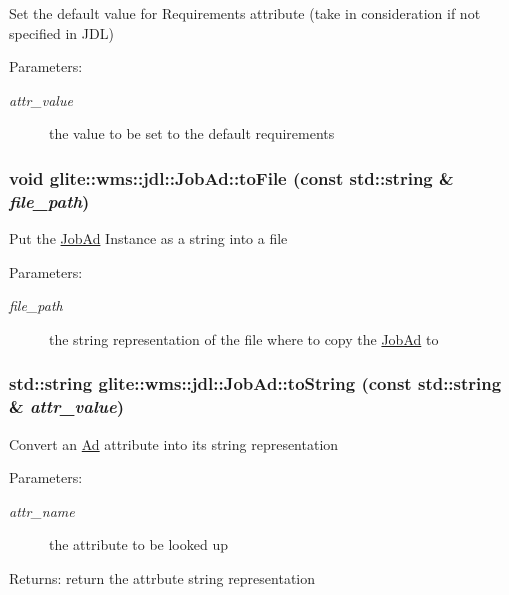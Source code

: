 Set the default value for Requirements attribute (take in consideration if not specified in JDL) \begin{Desc}
\item[Parameters:]
\begin{description}
\item[{\em attr\_\-value}]the value to be set to the default requirements\end{description}
\end{Desc}
\hypertarget{classglite_1_1wms_1_1jdl_1_1JobAd_z3_4}{
\subsubsection[toFile]{\setlength{\rightskip}{0pt plus 5cm}void glite::wms::jdl::Job\-Ad::to\-File (const std::string \& {\em file\_\-path})}}
\label{classglite_1_1wms_1_1jdl_1_1JobAd_z3_4}


Put the \hyperlink{classglite_1_1wms_1_1jdl_1_1JobAd}{Job\-Ad} Instance as a string into a file \begin{Desc}
\item[Parameters:]
\begin{description}
\item[{\em file\_\-path}]the string representation of the file where to copy the \hyperlink{classglite_1_1wms_1_1jdl_1_1JobAd}{Job\-Ad} to\end{description}
\end{Desc}
\hypertarget{classglite_1_1wms_1_1jdl_1_1JobAd_z3_2}{
\subsubsection[toString]{\setlength{\rightskip}{0pt plus 5cm}std::string glite::wms::jdl::Job\-Ad::to\-String (const std::string \& {\em attr\_\-value})}}
\label{classglite_1_1wms_1_1jdl_1_1JobAd_z3_2}


Convert an \hyperlink{classglite_1_1wms_1_1jdl_1_1Ad}{Ad} attribute into its string representation \begin{Desc}
\item[Parameters:]
\begin{description}
\item[{\em attr\_\-name}]the attribute to be looked up \end{description}
\end{Desc}
\begin{Desc}
\item[Returns:]return the attrbute string representation \end{Desc}


